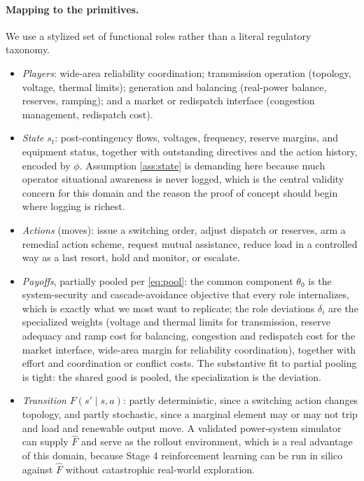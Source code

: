 \documentclass[11pt]{article}
\theoremstyle{definition}
\begin{document}
\paragraph{Mapping to the primitives.}
We use a stylized set of functional roles rather than a literal regulatory taxonomy.
\begin{itemize}[leftmargin=1.4em,itemsep=2pt,topsep=2pt]
  \item \emph{Players}: wide-area reliability coordination; transmission operation (topology, voltage, thermal limits); generation and balancing (real-power balance, reserves, ramping); and a market or redispatch interface (congestion management, redispatch cost).
  \item \emph{State} $s_t$: post-contingency flows, voltages, frequency, reserve margins, and equipment status, together with outstanding directives and the action history, encoded by $\phi$. Assumption \ref{ass:state} is demanding here because much operator situational awareness is never logged, which is the central validity concern for this domain and the reason the proof of concept should begin where logging is richest.
  \item \emph{Actions} (moves): issue a switching order, adjust dispatch or reserves, arm a remedial action scheme, request mutual assistance, reduce load in a controlled way as a last resort, hold and monitor, or escalate.
  \item \emph{Payoffs}, partially pooled per \eqref{eq:pool}: the common component $\theta_0$ is the system-security and cascade-avoidance objective that every role internalizes, which is exactly what we most want to replicate; the role deviations $\delta_i$ are the specialized weights (voltage and thermal limits for transmission, reserve adequacy and ramp cost for balancing, congestion and redispatch cost for the market interface, wide-area margin for reliability coordination), together with effort and coordination or conflict costs. The substantive fit to partial pooling is tight: the shared good is pooled, the specialization is the deviation.
  \item \emph{Transition} $F(s'\mid s,a)$: partly deterministic, since a switching action changes topology, and partly stochastic, since a marginal element may or may not trip and load and renewable output move. A validated power-system simulator can supply $\hat F$ and serve as the rollout environment, which is a real advantage of this domain, because Stage 4 reinforcement learning can be run in silico against $\hat F$ without catastrophic real-world exploration.
\end{itemize}
\end{document}
